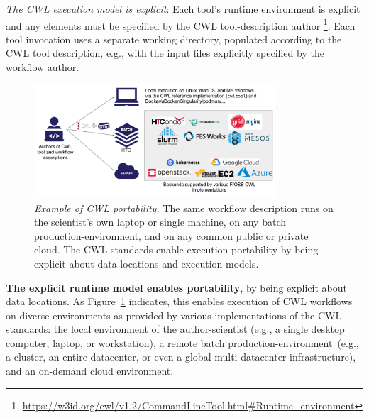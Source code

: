 \documentclass[sigconf,authordraft]{acmart}
\begin{document}
\textit{The CWL execution model is explicit}: Each tool's runtime environment is explicit and any  elements must be specified by the CWL tool-description author \footnote{ \url{https://w3id.org/cwl/v1.2/CommandLineTool.html\#Runtime_environment}}. Each tool invocation uses a separate working directory, populated according to the CWL tool description, e.g., with the input files explicitly specified by the workflow author. 

\begin{figure}
  \centering
  \includegraphics[width=0.8\textwidth]{figure2}
  \vspace*{-0.5cm}
  \caption{\emph{Example of CWL portability.} The same workflow description runs on the scientist's own laptop or single machine, on any batch production-environment, and on any common public or private cloud. The CWL standards enable execution-portability by being explicit about data locations and execution models.} 
  \label{fig:portability}
\end{figure}

\textbf{The explicit runtime model enables portability}, by being explicit about data locations. As Figure~\ref{fig:portability} indicates, this enables execution of CWL workflows on diverse environments as provided by various implementations of the CWL standards: the local environment of the author-scientist (e.g., a single desktop computer, laptop, or workstation), a remote batch production-environment~(e.g., a cluster, an entire datacenter, or even a global multi-datacenter infrastructure), and an on-demand cloud environment.
\end{document}
